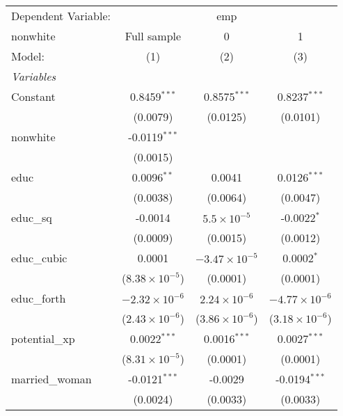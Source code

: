 
\begingroup
\centering
\begin{tabular}{lccc}
   \tabularnewline \midrule \midrule
   Dependent Variable: & \multicolumn{3}{c}{emp}\\
   nonwhite        & Full sample             & 0                       & 1 \\   
   Model:          & (1)                     & (2)                     & (3)\\  
   \midrule
   \emph{Variables}\\
   Constant        & 0.8459$^{***}$          & 0.8575$^{***}$          & 0.8237$^{***}$\\   
                   & (0.0079)                & (0.0125)                & (0.0101)\\   
   nonwhite        & -0.0119$^{***}$         &                         &   \\   
                   & (0.0015)                &                         &   \\   
   educ            & 0.0096$^{**}$           & 0.0041                  & 0.0126$^{***}$\\   
                   & (0.0038)                & (0.0064)                & (0.0047)\\   
   educ\_sq        & -0.0014                 & $5.5\times 10^{-5}$     & -0.0022$^{*}$\\   
                   & (0.0009)                & (0.0015)                & (0.0012)\\   
   educ\_cubic     & 0.0001                  & $-3.47\times 10^{-5}$   & 0.0002$^{*}$\\   
                   & ($8.38\times 10^{-5}$)  & (0.0001)                & (0.0001)\\   
   educ\_forth     & $-2.32\times 10^{-6}$   & $2.24\times 10^{-6}$    & $-4.77\times 10^{-6}$\\    
                   & ($2.43\times 10^{-6}$)  & ($3.86\times 10^{-6}$)  & ($3.18\times 10^{-6}$)\\    
   potential\_xp   & 0.0022$^{***}$          & 0.0016$^{***}$          & 0.0027$^{***}$\\   
                   & ($8.31\times 10^{-5}$)  & (0.0001)                & (0.0001)\\   
   married\_woman  & -0.0121$^{***}$         & -0.0029                 & -0.0194$^{***}$\\   
                   & (0.0024)                & (0.0033)                & (0.0033)\\   

\end{tabular}
